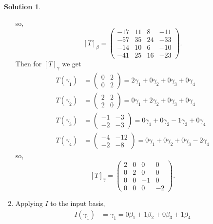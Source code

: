\documentclass[10pt]{article}
\theoremstyle{definition}
\newtheorem{soln}{Solution}
\begin{document}
\begin{soln}
\begin{enumerate}[label=(\alph*)]
          so,
          $$\left[T\right]_\beta=\begin{pmatrix}
              -17 & 11 & 8  & -11 \\
              -57 & 35 & 24 & -33 \\
              -14 & 10 & 6  & -10 \\
              -41 & 25 & 16 & -23
            \end{pmatrix}.$$
          Then for $\left[T\right]_\gamma$ we get
          \begin{align*}
            T(\gamma_1) & =\begin{pmatrix}
                             0 & 2 \\
                             0 & 2
                           \end{pmatrix}=2\gamma_1+0\gamma_2+0\gamma_3+0\gamma_4 \\
            T(\gamma_2) & =\begin{pmatrix}
                             2 & 2 \\
                             2 & 0
                           \end{pmatrix}=0\gamma_1+2\gamma_2+0\gamma_3+0\gamma_4 \\
            T(\gamma_3) & =\begin{pmatrix}
                             -1 & -3 \\
                             -2 & -3
                           \end{pmatrix}=0\gamma_1+0\gamma_2-1\gamma_3+0\gamma_4 \\
            T(\gamma_4) & =\begin{pmatrix}
                             -4 & -12 \\
                             -2 & -8
                           \end{pmatrix}=0\gamma_1+0\gamma_2+0\gamma_3-2\gamma_4
          \end{align*}
          so,
          $$\left[T\right]_\gamma=\begin{pmatrix}
              2 & 0 & 0  & 0  \\
              0 & 2 & 0  & 0  \\
              0 & 0 & -1 & 0  \\
              0 & 0 & 0  & -2
            \end{pmatrix}.$$
    \item Applying $I$ to the input basis,
          \begin{align*}
            I(\gamma_1) & =\gamma_1=0\beta_1+1\beta_2+0\beta_3+1\beta_4 \\

\end{align*}
\end{enumerate}
\end{soln}
\end{document}
